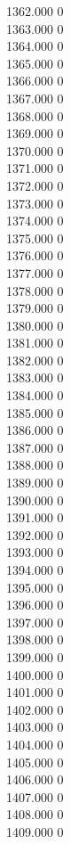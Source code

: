 { 1362.000	0 \\
 1363.000	0 \\
 1364.000	0 \\
 1365.000	0 \\
 1366.000	0 \\
 1367.000	0 \\
 1368.000	0 \\
 1369.000	0 \\
 1370.000	0 \\
 1371.000	0 \\
 1372.000	0 \\
 1373.000	0 \\
 1374.000	0 \\
 1375.000	0 \\
 1376.000	0 \\
 1377.000	0 \\
 1378.000	0 \\
 1379.000	0 \\
 1380.000	0 \\
 1381.000	0 \\
 1382.000	0 \\
 1383.000	0 \\
 1384.000	0 \\
 1385.000	0 \\
 1386.000	0 \\
 1387.000	0 \\
 1388.000	0 \\
 1389.000	0 \\
 1390.000	0 \\
 1391.000	0 \\
 1392.000	0 \\
 1393.000	0 \\
 1394.000	0 \\
 1395.000	0 \\
 1396.000	0 \\
 1397.000	0 \\
 1398.000	0 \\
 1399.000	0 \\
 1400.000	0 \\
 1401.000	0 \\
 1402.000	0 \\
 1403.000	0 \\
 1404.000	0 \\
 1405.000	0 \\
 1406.000	0 \\
 1407.000	0 \\
 1408.000	0 \\
 1409.000	0 \\
}
